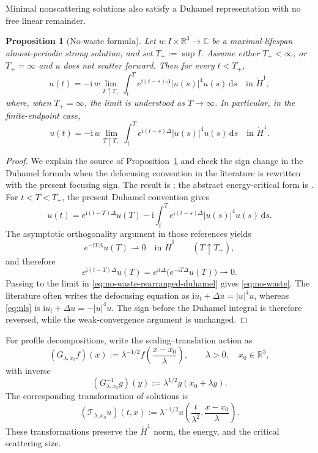 \documentclass{interact}
\numberwithin{equation}{section}
\theoremstyle{plain}
\newtheorem{proposition}[theorem]{Proposition}
\theoremstyle{definition}
\theoremstyle{remark}
\newcommand{\R}{\mathbb R}
\newcommand{\C}{\mathbb C}
\newcommand{\ii}{\mathrm i}
\newcommand{\dd}{\,\mathrm d}
\begin{document}
Minimal nonscattering solutions also satisfy a Duhamel representation with no free linear remainder.

\begin{proposition}[No-waste formula]\label{prop:no-waste}
Let $u:I\times\R^3\to\C$ be a maximal-lifespan almost-periodic strong solution, and set $T_+:=\sup I$. Assume either $T_+<\infty$, or $T_+=\infty$ and $u$ does not scatter forward. Then for every $t<T_+$,
\begin{equation}\label{eq:no-waste}
 u(t)
 =-\ii\,w\!\!\lim_{T\uparrow T_+}
 \int_t^T e^{\ii(t-s)\Delta}|u(s)|^4u(s)\dd s
 \quad\text{in }\dot H^1,
\end{equation}
where, when $T_+=\infty$, the limit is understood as $T\to\infty$. In particular, in the finite-endpoint case,
\begin{equation}\label{eq:no-waste-finite}
 u(t)
 =-\ii\,w\!\!\lim_{T\uparrow T_+}
 \int_t^T e^{\ii(t-s)\Delta}|u(s)|^4u(s)\dd s
 \quad\text{in }\dot H^1.
\end{equation}
\end{proposition}

\begin{proof}
We explain the source of Proposition~\ref{prop:no-waste} and check the sign change in the Duhamel formula when the defocusing convention in the literature is rewritten with the present focusing sign. The result is \cite[Proposition~1.9]{KillipVisan2012}; the abstract energy-critical form is \cite[Proposition~5.23]{KillipVisan2013}. For $t<T<T_+$, the present Duhamel convention gives
\begin{equation}\label{eq:no-waste-rearranged-duhamel}
 u(t)=e^{\ii(t-T)\Delta}u(T)
 -\ii\int_t^T e^{\ii(t-s)\Delta}|u(s)|^4u(s)\dd s.
\end{equation}
The asymptotic orthogonality argument in those references yields
\[
 e^{-\ii T\Delta}u(T)\rightharpoonup0
 \quad\text{in }\dot H^1
 \qquad(T\uparrow T_+),
\]
and therefore
\[
 e^{\ii(t-T)\Delta}u(T)
 =e^{\ii t\Delta}\bigl(e^{-\ii T\Delta}u(T)\bigr)\rightharpoonup0.
\]
Passing to the limit in \eqref{eq:no-waste-rearranged-duhamel} gives \eqref{eq:no-waste}. The literature often writes the defocusing equation as $\ii u_t+\Delta u=|u|^4u$, whereas \eqref{eq:nls} is $\ii u_t+\Delta u=-|u|^4u$. The sign before the Duhamel integral is therefore reversed, while the weak-convergence argument is unchanged.
\end{proof}

For profile decompositions, write the scaling--translation action as
\[
 (G_{\lambda,x_0}f)(x)
 :=\lambda^{-1/2}f\left(\frac{x-x_0}{\lambda}\right),
 \qquad \lambda>0,\quad x_0\in\R^3,
\]
with inverse
\[
 (G_{\lambda,x_0}^{-1}g)(y)
 :=\lambda^{1/2}g(x_0+\lambda y).
\]
The corresponding transformation of solutions is
\[
 (\mathcal T_{\lambda,x_0}u)(t,x)
 :=\lambda^{-1/2}u\left(\frac{t}{\lambda^2},
 \frac{x-x_0}{\lambda}\right).
\]
These transformations preserve the $\dot H^1$ norm, the energy, and the critical scattering size.
\end{document}
